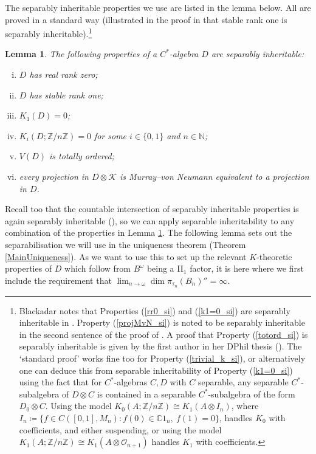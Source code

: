 \documentclass[reqno]{amsart}
\newtheorem{lem}[thm]{Lemma}
\theoremstyle{definition}
\theoremstyle{remark}
\numberwithin{equation}{section}
\theoremstyle{definition}
\begin{document}
The separably inheritable properties we use are listed in the lemma below.  All are proved in a standard way (illustrated in the proof in \cite[II.8.5.4]{Blackadar} that stable rank one is separably inheritable).\footnote{Blackadar notes that Properties (\ref{rr0_si}) and (\ref{k1=0_si}) are separably inheritable in \cite[II.8.5.5] {Blackadar}. Property (\ref{projMvN_si}) is noted to be separably inheritable in the second sentence of the proof of \cite[Proposition 4.1]{new-TWW}. A proof that Property (\ref{totord_si}) is separably inheritable is given by the first author in her DPhil thesis (\cite[Lemma 7.1.2]{Hua_thesis}). The `standard proof' works fine too for Property (\ref{trivial_k_si}), or alternatively one can deduce this from separable inheritability of Property (\ref{k1=0_si}) using the fact that for $C^*$-algebras $C,D$ with $C$ separable, any separable $C^*$-subalgebra of $D\otimes C$ is contained in a separable $C^*$-subalgebra of the form $D_0\otimes C$.  Using the model $K_0(A;\mathbb Z/n\mathbb Z)\cong K_1(A\otimes I_n)$, where $I_n\coloneqq\{f\in C([0,1],M_n):f(0)\in \mathbb C1_n,\ f(1)=0\}$, handles $K_0$ with coefficients, and either suspending, or using the model $K_1(A;\mathbb Z/n\mathbb Z)\cong K_1(A\otimes\mathcal O_{n+1})$ handles $K_1$ with coefficients.}  

\begin{lem} 
\label{sep_inh_properties} 
The following properties of a $C^*$-algebra $D$ are separably inheritable: 
\begin{enumerate} [(i)] 
\item \label{rr0_si} $D$ has real rank zero; 
\item \label{sr0_si} $D$ has stable rank one; 
\item $K_1(D)=0$;\label{k1=0_si}
\item \label{trivial_k_si} $K_{i} (D; \mathbb{Z} / n\mathbb{Z}) = 0$ for some $i\in \{0, 1\}$ and $n\in \mathbb{N}$; 
\item \label{MvN_si} $V(D)$ is totally ordered; \label{totord_si}
\item every projection in $D\otimes\mathcal K$ is Murray--von Neumann equivalent to a projection in $D$.\label{projMvN_si}
\end{enumerate} 
\end{lem} 

Recall too that the countable intersection of separably inheritable properties is again separably inheritable (\cite[II.8.5.3]{Blackadar}), so we can apply separable inheritability to any combination of the properties in Lemma \ref{sep_inh_properties}.  The following lemma sets out the separabilisation we will use in the uniqueness theorem (Theorem \ref{MainUniqueness}). As we want to use this to set up the relevant $K$-theoretic properties of $D$ which follow from $B^\omega$ being a II$_1$ factor, it is here where we first include the requirement that $\lim_{n\to\omega}\dim\pi_{\tau_n}(B_n)''=\infty$.
\end{document}
